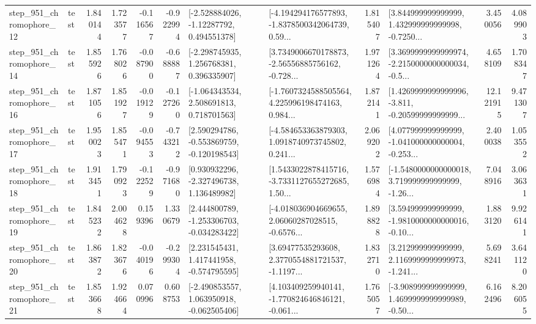 \begin{tabular}{llrrrrllrlrr}
  step\_951\_chromophore\_12 &      test &      1.840144 &    1.723577 &     -0.116567 & -0.922994 &    [-2.528884026, -1.12287792, 0.494551378] &  [-4.194294176577893, -1.8378500342064739, 0.59... &       1.815407 &  [3.844999999999999, 1.432999999999998, -0.7250... &            3.450056 &          4.089903 \\
  step\_951\_chromophore\_14 &      test &      1.855926 &    1.768026 &     -0.087900 & -0.688887 &    [-2.298745935, 1.256768381, 0.396335907] &  [3.7349006670178873, -2.56556885756162, -0.728... &       1.971264 &  [3.3699999999999974, -2.2150000000000034, -0.5... &            4.658109 &          1.708347 \\
  step\_951\_chromophore\_16 &      test &      1.871056 &    1.851927 &     -0.019129 & -0.127260 &    [-1.064343534, 2.508691813, 0.718701563] &  [-1.7607324588505564, 4.225996198474163, 0.984... &       1.872141 &  [1.4269999999999996, -3.811, -0.20599999999999... &           12.121915 &          9.471307 \\
  step\_951\_chromophore\_17 &      test &      1.950023 &    1.855471 &     -0.094553 & -0.743212 &   [2.590294786, -0.553869759, -0.120198543] &  [-4.584653363879303, 1.0918740973745802, 0.241... &       2.069202 &  [4.077999999999999, -1.041000000000004, -0.253... &            2.400038 &          1.053552 \\
  step\_951\_chromophore\_18 &      test &      1.913451 &    1.790923 &     -0.122529 & -0.971680 &    [0.930932296, -2.327496738, 1.136489982] &  [1.5433022878415716, -3.7331127655272685, 1.50... &       1.576984 &  [-1.5480000000000018, 3.719999999999999, -1.26... &            7.048916 &          3.063631 \\
  step\_951\_chromophore\_19 &      test &      1.845232 &    2.004628 &      0.159396 &  1.330679 &   [2.444800789, -1.253306703, -0.034283422] &  [-4.018036904669655, 2.06060287028515, -0.6576... &       1.898828 &  [3.594999999999999, -1.9810000000000016, -0.10... &            1.883120 &          9.926141 \\
  step\_951\_chromophore\_20 &      test &      1.863872 &    1.823676 &     -0.040196 & -0.299304 &    [2.231545431, 1.417441958, -0.574795595] &  [3.69477535293608, 2.3770554881721537, -1.1197... &       1.832710 &  [3.212999999999999, 2.1169999999999973, -1.241... &            5.698241 &          3.641120 \\
  step\_951\_chromophore\_21 &      test &      1.853668 &    1.924664 &      0.070996 &  0.608753 &   [-2.490853557, 1.063950918, -0.062505406] &  [4.103409259940141, -1.770824646846121, -0.061... &       1.765057 &  [-3.908999999999999, 1.4699999999999989, -0.50... &            6.162496 &          8.206055 \\

\end{tabular}
